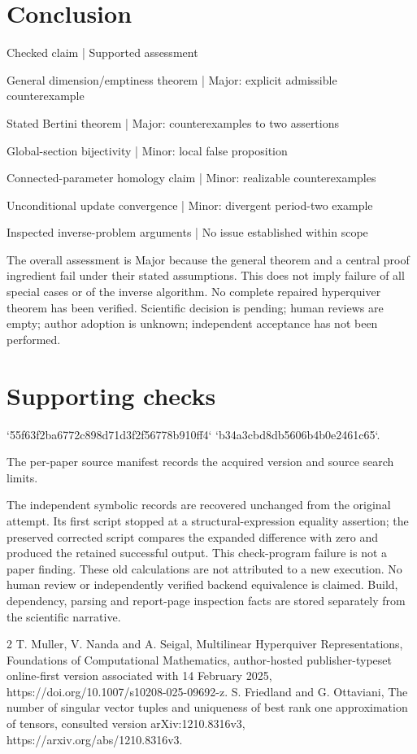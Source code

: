 \documentclass[10pt]{article}
\begin{document}
\section*{Conclusion}
Checked claim | Supported assessment\par
General dimension/emptiness theorem | Major: explicit admissible counterexample\par
Stated Bertini theorem | Major: counterexamples to two assertions\par
Global-section bijectivity | Minor: local false proposition\par
Connected-parameter homology claim | Minor: realizable counterexamples\par
Unconditional update convergence | Minor: divergent period-two example\par
Inspected inverse-problem arguments | No issue established within scope\par
The overall assessment is Major because the general theorem and a central proof ingredient fail under their stated assumptions. This does not imply failure of all special cases or of the inverse algorithm. No complete repaired hyperquiver theorem has been verified. Scientific decision is pending; human reviews are empty; author adoption is unknown; independent acceptance has not been performed.\par
\section*{Supporting checks}
`55f63f2ba6772c898d71d3f2f56778b910ff4`
`b34a3cbd8db5606b4b0e2461c65`.\par
The per-paper source manifest records the acquired version and source search limits.\par
The independent symbolic records are recovered unchanged from the original attempt. Its first script stopped at a structural-expression equality assertion; the preserved corrected script compares the expanded difference with zero and produced the retained successful output. This check-program failure is not a paper finding. These old calculations are not attributed to a new execution. No human review or independently verified backend equivalence is claimed. Build, dependency, parsing and report-page inspection facts are stored separately from the scientific narrative.\par
2 T. Muller, V. Nanda and A. Seigal, Multilinear Hyperquiver Representations, Foundations of Computational Mathematics, author-hosted publisher-typeset online-first version associated with 14 February 2025, https://doi.org/10.1007/s10208-025-09692-z. S. Friedland and G. Ottaviani, The number of singular vector tuples and uniqueness of best rank one approximation of tensors, consulted version arXiv:1210.8316v3, https://arxiv.org/abs/1210.8316v3.\par
\end{document}
